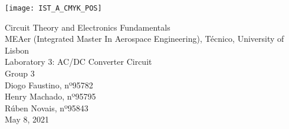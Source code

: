 
\thispagestyle {empty}

\texttt{[image: IST\_A\_CMYK\_POS]}

\begin{center}
%
\vspace{1.0cm}

\vspace{1cm}
{\FontLb Circuit Theory and Electronics Fundamentals} \\ %
\vspace{1cm}
{\FontSn MEAer (Integrated Master In Aerospace Engineering), Técnico, University of Lisbon} \\ %
\vspace{1cm}
{\FontSn Laboratory 3: AC/DC Converter Circuit} \\
\vspace{1cm}
{\FontSn Group 3} \\
\vspace{0.7cm}
{\FontSn Diogo Faustino, nº95782} \\
\vspace{0.4mm}
{\FontSn Henry Machado, nº95795} \\
\vspace{0.4mm}
{\FontSn Rúben Novais, nº95843} \\
\vspace{1cm}
{\FontSn May 8, 2021} \\ %
%
\end{center}

